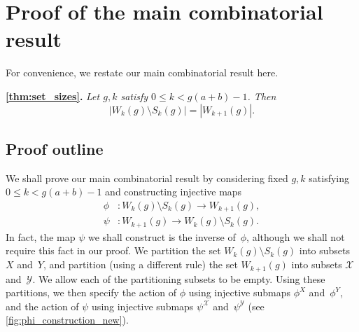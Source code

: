 \documentclass[11pt]{article}
\theoremstyle{definition} %
\numberwithin{equation}{section}
\begin{document}
\section{Proof of the main combinatorial result}
\label{sec:bijection}

For convenience, we restate our main combinatorial result here.

{\bf \cref{thm:set_sizes}.}
\textit{Let $g,k$ satisfy $0 \le k < g(a+b)-1$. Then}
    $$
        |W_k(g) \setminus S_k(g)| = |W_{k+1}(g)|.
    $$


\subsection{Proof outline}

We shall prove our main combinatorial result by considering fixed $g,k$ satisfying $0 \le k < g(a+b)-1$ and constructing injective maps
\begin{align}
    \phi &\colon W_k(g) \setminus S_k(g) \to W_{k+1}(g),\\
    \psi &\colon W_{k+1}(g) \to W_k(g) \setminus S_k(g).
\end{align} 
In fact, the map $\psi$ we shall construct is the inverse of~$\phi$, although we shall not require this fact in our proof.
We partition the set $W_k(g) \setminus S_k(g)$ into subsets $X$ and~$Y$, and partition (using a different rule) the set $W_{k+1}(g)$ into subsets $\mathcal{X}$ and~$\mathcal{Y}$. We allow each of the partitioning subsets to be empty.
Using these partitions, we then specify the action of $\phi$ using injective submaps $\phi^X$ and~$\phi^Y$, and the action of $\psi$ using injective submaps $\psi^{\mathcal X}$ and~$\psi^{\mathcal Y}$
(see \cref{fig:phi_construction_new}). 
\end{document}
